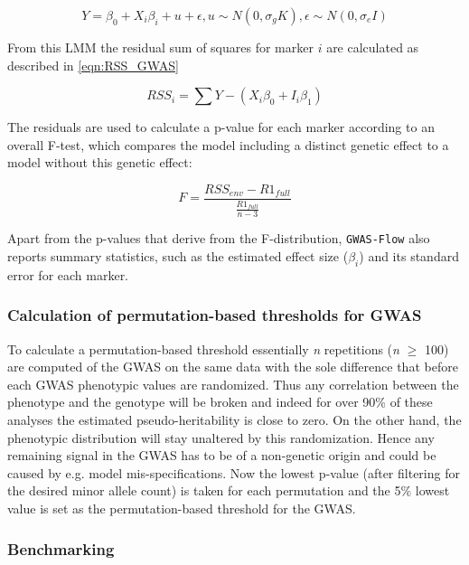 \begin{equation}
Y = \beta_{0} + X_i\beta_i + u + \epsilon, u \sim N(0,\sigma_gK), \epsilon \sim N(0,\sigma_e I )
\label{eqn:LMM GWAS}
\end{equation}

\noindent
From this LMM the residual sum of squares for marker $i$ are calculated as described in
\ref{eqn:RSS_GWAS}

\begin{equation}
RSS_{i} = \sum{Y - (X_{i}\beta_{0}  + I_{i}\beta_{1})}
\label{eqn:RSS_GWAS}
\end{equation}

\noindent
The residuals are used to calculate a p-value for each marker according to an overall
F-test, which compares the model including a distinct genetic effect to a model without
this genetic effect:

\begin{equation}
 F = \frac{RSS_{env} - R1_{full} }{\frac{R1_{full}}{n-3}}
 \label{F_test}
\end{equation}

\noindent
Apart from the p-values that derive from the F-distribution, \texttt{GWAS-Flow} also
reports summary statistics, such as the estimated effect size ($\beta_i$) and its standard
error for each marker.

\subsubsection{Calculation of permutation-based thresholds for GWAS}

To calculate a permutation-based threshold essentially \textit{n} repetitions (\textit{n}
$\geq$ 100) are computed of the GWAS on the same data with the sole difference that before
each GWAS phenotypic values are randomized. Thus any correlation between the phenotype and
the genotype will be broken and indeed for over 90\% of these analyses the estimated
pseudo-heritability is close to zero. On the other hand, the phenotypic distribution will
stay unaltered by this randomization. Hence any remaining signal in the GWAS has to be of
a non-genetic origin and could be caused by e.g. model mis-specifications. Now the lowest
p-value (after filtering for the desired minor allele count) is taken for each permutation
and the 5\% lowest value is set as the permutation-based threshold for the GWAS.

\subsubsection{Benchmarking}

